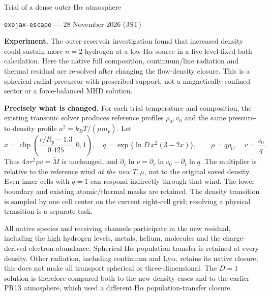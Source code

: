 \documentclass[10pt,a4paper]{article}
\begin{document}
\begin{center}
{\Large Trial of a dense outer H$\alpha$ atmosphere}\par\vspace{4pt}
\texttt{exojax-escape} --- 28 November 2026 (JST)
\end{center}

\textbf{Experiment.}
The outer-reservoir investigation found that increased density could sustain
more $n=2$ hydrogen at a low H$\alpha$ source in a five-level fixed-bath
calculation. Here the native full composition, continuum/line radiation and
thermal residual are re-solved after changing the flow-density closure.
This is a spherical radial precursor with prescribed support, not a
magnetically confined sector or a force-balanced MHD solution.



\clearpage
\textbf{Precisely what is changed.}
For each trial temperature and composition, the existing transonic solver
produces reference profiles $\rho_0,v_0$ and the same pressure-to-density
profile $a^2=k_BT/(\mu m_p)$. Let
\[
 x=\operatorname{clip}\!\left(\frac{r/R_p-1.3}{0.425},0,1\right),\quad
 q=\exp\{\ln D\,x^2(3-2x)\},\qquad
 \rho=q\rho_0,\quad v=\frac{v_0}{q}.
\]
Thus $4\pi r^2\rho v=\dot M$ is unchanged, and
$\partial_r\ln v=\partial_r\ln v_0-\partial_r\ln q$.
The multiplier is relative to the reference wind \emph{at the new $T,\mu$},
not to the original saved density. Even inner cells with $q=1$ can respond
indirectly through that wind. The lower boundary and existing atomic/thermal
masks are retained. The density transition is sampled by one cell center on
the current eight-cell grid; resolving a physical transition is a separate task.

All native species and receiving channels participate in the new residual,
including the high hydrogen levels, metals, helium, molecules and the
charge-derived electron abundance. Spherical H$\alpha$ population transfer
is retained at every density. Other radiation, including continuum and
Ly$\alpha$, retains its native closure; this does not make all transport
spherical or three-dimensional. The $D=1$ solution is therefore compared both
to the new density cases and to the earlier PR13 atmosphere, which used a
different H$\alpha$ population-transfer closure.
\end{document}
